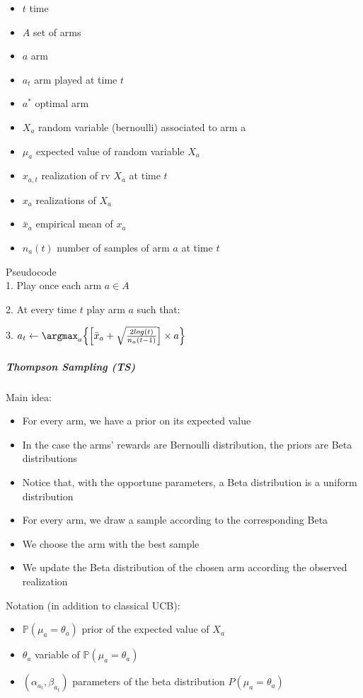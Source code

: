 \begin{itemize}
\item $t$ time
\item $A$ set of arms
\item $a$ arm
\item $a_{t}$ arm played at time $t$
\item $a^*$ optimal arm
\item $X_{a}$ random variable (bernoulli) associated to arm a
\item $\mu_{a}$ expected value of random variable $X_{a}$
\item $x_{a,t}$ realization of rv $X_{a}$ at time $t$
\item $x_{a}$ realizations of $X_{a}$
\item $\bar{x}_{a}$ empirical mean of $x_{a}$
\item $n_{a}(t)$ number of samples of arm $a$ at time $t$
\end{itemize}

Pseudocode\\

1. Play once each arm $a \in A$

2. At every time $t$ play arm $a$ such that:



3. $a_{t} \leftarrow \argmax_a{\left\{\left[\bar{x}_{a} + \sqrt{\frac{2 log(t)}{{n_{a}(t-1)}} }\right]\times a\right\}}$

\subparagraph*{Thompson Sampling (TS)}
Main idea:
\begin{itemize}
	\item For every arm, we have a prior on its expected value 
	\item In the case the arms’ rewards are Bernoulli distribution, the priors are Beta distributions
	\item Notice that, with the opportune parameters, a Beta distribution is a uniform distribution 
	\item For every arm, we draw a sample according to the corresponding Beta
	\item We choose the arm with the best sample 
	\item We update the Beta distribution of the chosen arm according the observed realization
\end{itemize}

Notation (in addition to classical UCB):\\
\begin{itemize}
	\item $\mathbb P(\mu_{a}=\theta_{a})$ prior of the expected value of $X_{a}$
	\item $\theta_{a}$ variable of $\mathbb P(\mu_{a}=\theta_{a})$
	\item $(\alpha_{a_{t}}, \beta_{a_{t}})$ parameters of the beta distribution $P(\mu_{a}=\theta_{a})$
\end{itemize}

